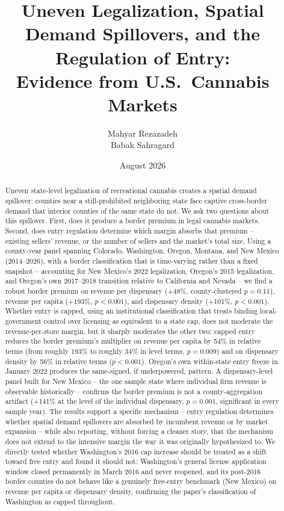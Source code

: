 \documentclass[12pt]{article}
\title{Uneven Legalization, Spatial Demand Spillovers, and the Regulation of Entry:\\
Evidence from U.S.\ Cannabis Markets}
\author{Mahyar Rezazadeh \\ Babak Sahragard}
\date{August 2026}
\begin{document}
\maketitle

\begin{abstract}
\noindent Uneven state-level legalization of recreational cannabis creates a spatial demand spillover: counties
near a still-prohibited neighboring state face captive cross-border demand that interior counties of the same
state do not. We ask two questions about this spillover. First, does it produce a border premium in legal
cannabis markets. Second, does entry regulation determine which margin absorbs that premium -- existing
sellers' revenue, or the number of sellers and the market's total size. Using a county-year panel spanning
Colorado, Washington, Oregon, Montana, and New Mexico (2014--2026), with a border classification that is
time-varying rather than a fixed snapshot -- accounting for New Mexico's 2022 legalization, Oregon's 2015
legalization, and Oregon's own 2017--2018 transition relative to California and Nevada -- we find a robust
border premium on revenue per dispensary (+48\%, county-clustered $p=0.11$), revenue per capita (+193\%,
$p<0.001$), and dispensary density (+101\%, $p<0.001$). Whether entry is capped, using an institutional
classification that treats binding local-government control over licensing as equivalent to a state cap, does
not moderate the revenue-per-store margin, but it sharply moderates the other two: capped entry reduces the
border premium's multiplier on revenue per capita by 54\% in relative terms (from roughly 193\% to roughly
34\% in level terms, $p=0.009$) and on dispensary density by 56\% in relative terms ($p<0.001$). Oregon's own
within-state entry freeze in January 2022 produces the same-signed, if
underpowered, pattern. A dispensary-level panel built for New Mexico -- the one sample state where individual
firm revenue is observable historically -- confirms the border premium is not a county-aggregation artifact
(+141\% at the level of the individual dispensary, $p=0.001$, significant in every sample year). The results
support a specific mechanism -- entry regulation determines whether spatial
demand spillovers are absorbed by incumbent revenue or by market expansion -- while also reporting, without
forcing a cleaner story, that the mechanism does not extend to the intensive margin the way it was originally
hypothesized to. We directly tested whether Washington's 2016 cap increase should be treated as a shift toward
free entry and found it should not: Washington's general license application window closed permanently in
March 2016 and never reopened, and its post-2016 border counties do not behave like a genuinely free-entry
benchmark (New Mexico) on revenue per capita or dispensary density, confirming the paper's classification of
Washington as capped throughout.
\end{abstract}
\end{document}
